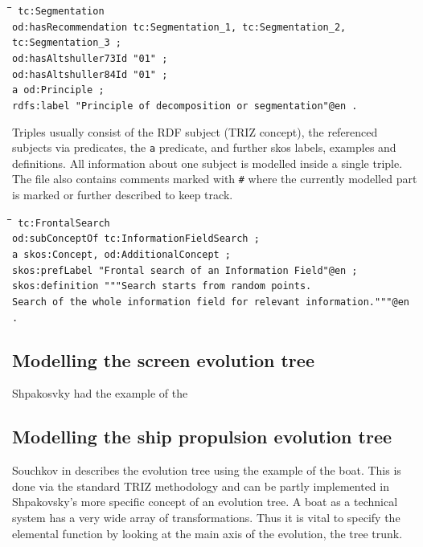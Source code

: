 \documentclass[11pt,a4paper]{article}
\newenvironment{code}{\tt \begin{tabbing}
\hskip12pt\=\hskip12pt\=\hskip12pt\=\hskip12pt\=\hskip5cm\=\hskip5cm\=\kill}
{\end{tabbing}}
\begin{document}
\begin{code}\tt
tc:Segmentation \\
\> od:hasRecommendation tc:Segmentation\_1, tc:Segmentation\_2,
tc:Segmentation\_3 ; \\ 
\> od:hasAltshuller73Id "01" ; \\
\> od:hasAltshuller84Id "01" ; \\
\> a od:Principle ; \\
\> rdfs:label "Principle of decomposition or segmentation"@en .
\end{code}

Triples usually consist of the RDF subject (TRIZ concept), the referenced
subjects via predicates, the \texttt{a} predicate, and further skos labels,
examples and definitions. All information about one subject is modelled inside
a single triple. The file also contains comments marked with \texttt{\#} where
the currently modelled part is marked or further described to keep track.

\begin{code}\tt
tc:FrontalSearch \\
\> od:subConceptOf tc:InformationFieldSearch ; \\
\> a skos:Concept, od:AdditionalConcept ; \\
\> skos:prefLabel "Frontal search of an Information Field"@en ; \\
\> skos:definition """Search starts from random points. \\
\>\> Search of the whole information field for relevant information."""@en .
\end{code}

\subsection{Modelling the screen evolution tree}

Shpakosvky had the example of the 

\subsection{Modelling the ship propulsion evolution tree}

Souchkov in \cite{KS} describes the evolution tree using the example of the
boat. This is done via the standard TRIZ methodology and can be partly
implemented in Shpakovsky's more specific concept of an evolution tree. A boat
as a technical system has a very wide array of transformations. Thus it is
vital to specify the elemental function by looking at the main axis of the
evolution, the tree trunk.
\end{document}
